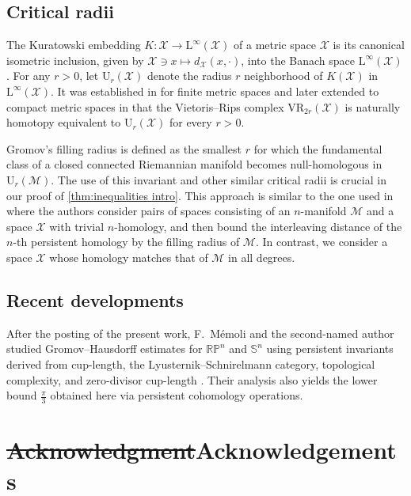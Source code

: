 \documentclass{amsart}
\theoremstyle{definition}
\newcommand{\rL}{\mathrm{L}}
\newcommand{\rU}{\mathrm{U}}
\newcommand{\cM}{\mathcal{M}}
\newcommand{\cX}{\mathcal{X}}
\newcommand{\bS}{\mathbb{S}}
\newcommand{\VR}{\mathrm{VR}}
\theoremstyle{theorem}
\newcommand{\rp}{\mathbb{RP}}
\providecommand{\DIFaddtex}[1]{{\protect\color{blue}\uwave{#1}}} %
\providecommand{\DIFdeltex}[1]{{\protect\color{red}\sout{#1}}}                      %
\providecommand{\DIFaddbegin}{} %
\providecommand{\DIFaddend}{} %
\providecommand{\DIFdelbegin}{} %
\providecommand{\DIFdelend}{} %
\providecommand{\DIFadd}[1]{\texorpdfstring{\DIFaddtex{#1}}{#1}} %
\providecommand{\DIFdel}[1]{\texorpdfstring{\DIFdeltex{#1}}{}} %
\newcommand{\DIFscaledelfig}{0.5}
\newlength{\DIFdelgraphicswidth} %
\newlength{\DIFdelgraphicsheight} %
\newcommand{\DIFaddincludegraphics}[2][]{{\color{blue}\fbox{\DIFOincludegraphics[#1]{#2}}}} %
\newcommand{\DIFdelincludegraphics}[2][]{%
\sbox{\DIFdelgraphicsbox}{\DIFOincludegraphics[#1]{#2}}%
\settoboxwidth{\DIFdelgraphicswidth}{\DIFdelgraphicsbox} %
\settoboxtotalheight{\DIFdelgraphicsheight}{\DIFdelgraphicsbox} %
\scalebox{\DIFscaledelfig}{%
\parbox[b]{\DIFdelgraphicswidth}{\usebox{\DIFdelgraphicsbox}\\[-\baselineskip] \rule{\DIFdelgraphicswidth}{0em}}\llap{\resizebox{\DIFdelgraphicswidth}{\DIFdelgraphicsheight}{%
\setlength{\unitlength}{\DIFdelgraphicswidth}%
\begin{picture}(1,1)%
\thicklines\linethickness{2pt} %
{\color[rgb]{1,0,0}\put(0,0){\framebox(1,1){}}}%
{\color[rgb]{1,0,0}\put(0,0){\line( 1,1){1}}}%
{\color[rgb]{1,0,0}\put(0,1){\line(1,-1){1}}}%
\end{picture}%
}\hspace*{3pt}}} %
} %
\DeclareRobustCommand{\DIFaddbegin}{\DIFOaddbegin \let\includegraphics\DIFaddincludegraphics} %
\DeclareRobustCommand{\DIFaddend}{\DIFOaddend \let\includegraphics\DIFOincludegraphics} %
\DeclareRobustCommand{\DIFdelbegin}{\DIFOdelbegin \let\includegraphics\DIFdelincludegraphics} %
\DeclareRobustCommand{\DIFdelend}{\DIFOaddend \let\includegraphics\DIFOincludegraphics} %
\renewcommand{\DIFadd}[1]{{\color{red}#1}}
\renewcommand{\DIFdel}[1]{{\color{deletedpurple}\ifmmode\oldmath{#1}\else\sout{#1}\fi}}
\newcommand{\oldmath}[1]{{\color{deletedpurple}\mathpalette\horizontalstrike{#1}}}
\newcommand{\horizontalstrike}[2]{\sbox0{$#1#2$}\rlap{\raisebox{.5\ht0}{\rule{\wd0}{.4pt}}}\usebox0}
\begin{document}
\subsection*{Critical radii}

The Kuratowski embedding \(K \colon \cX \to \rL^\infty(\cX)\) of a metric space \(\cX\) is its canonical isometric inclusion, given by \(\cX \ni x \mapsto d_\cX(x,\cdot)\), into the Banach space $\rL^\infty(\cX)$.
For any $r>0$, let \(\rU_r(\cX)\) denote the radius \(r\) neighborhood of \(K(\cX)\) in \(\rL^\infty(\cX)\).
It was established in \cite{chazal2009gromov} for finite metric spaces and later extended to compact metric spaces in \cite{lim2024vietoris} that the Vietoris--Rips complex \(\VR_{2r}(\cX)\) is naturally homotopy equivalent to \(\rU_r(\cX)\) for every \(r > 0\).

Gromov's filling radius is defined as the smallest \(r\) for which the fundamental class of a closed connected Riemannian manifold becomes null-homologous in \(\rU_r(\cM)\).
The use of this invariant and other similar critical radii is crucial in our proof of \cref{thm:inequalities intro}.
This approach is similar to the one used in \cite[\DIFdel{Prop.}\DIFadd{Proposition}~9.38]{lim2024vietoris} where the authors consider pairs of spaces consisting of an $n$-manifold \(\cM\) and a space \(\cX\) with trivial \(n\)-homology, and then bound the interleaving distance of the \(n\)-th persistent homology by the filling radius of \(\cM\).
In contrast, we consider a space \(\cX\) whose homology matches that of \(\cM\) in all degrees.

\subsection*{Recent developments}

After the posting of the present work, F.~M\'emoli and the second-named author studied Gromov--Hausdorff estimates for \(\rp^n\) and \(\bS^n\) using persistent invariants derived from cup-length, the Lyusternik--Schnirelmann category, topological complexity, and zero-divisor cup-length \cite{memoli2025persistence}.
Their analysis also yields the lower bound \(\frac{\pi}{3}\) obtained here via persistent cohomology operations.


	


\section*{\DIFdelbegin \DIFdel{Acknowledgment}\DIFdelend \DIFaddbegin \DIFadd{Acknowledgements}\DIFaddend }
\end{document}
